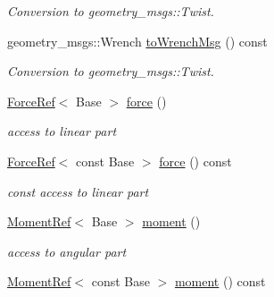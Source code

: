 \begin{DoxyCompactItemize}
\begin{DoxyCompactList}\small\item\em Conversion to geometry\+\_\+msgs\+::\+Twist. \end{DoxyCompactList}\item 
geometry\+\_\+msgs\+::\+Wrench \hyperlink{classow__core_1_1Wrench_a304d746f248d1503c41c3dde2d4bb674}{to\+Wrench\+Msg} () const \hypertarget{classow__core_1_1Wrench_a304d746f248d1503c41c3dde2d4bb674}{}\label{classow__core_1_1Wrench_a304d746f248d1503c41c3dde2d4bb674}

\begin{DoxyCompactList}\small\item\em Conversion to geometry\+\_\+msgs\+::\+Twist. \end{DoxyCompactList}\item 
\hyperlink{classow__core_1_1ForceRef}{Force\+Ref}$<$ Base $>$ \hyperlink{classow__core_1_1Wrench_a1280c591f4fc192916f6398d92074870}{force} ()\hypertarget{classow__core_1_1Wrench_a1280c591f4fc192916f6398d92074870}{}\label{classow__core_1_1Wrench_a1280c591f4fc192916f6398d92074870}

\begin{DoxyCompactList}\small\item\em access to linear part \end{DoxyCompactList}\item 
\hyperlink{classow__core_1_1ForceRef}{Force\+Ref}$<$ const Base $>$ \hyperlink{classow__core_1_1Wrench_a4e8dce56464223a729052e6ad83dbe52}{force} () const \hypertarget{classow__core_1_1Wrench_a4e8dce56464223a729052e6ad83dbe52}{}\label{classow__core_1_1Wrench_a4e8dce56464223a729052e6ad83dbe52}

\begin{DoxyCompactList}\small\item\em const access to linear part \end{DoxyCompactList}\item 
\hyperlink{classow__core_1_1MomentRef}{Moment\+Ref}$<$ Base $>$ \hyperlink{classow__core_1_1Wrench_a8ce23dd81a3aaffc0298531f785647de}{moment} ()\hypertarget{classow__core_1_1Wrench_a8ce23dd81a3aaffc0298531f785647de}{}\label{classow__core_1_1Wrench_a8ce23dd81a3aaffc0298531f785647de}

\begin{DoxyCompactList}\small\item\em access to angular part \end{DoxyCompactList}\item 
\hyperlink{classow__core_1_1MomentRef}{Moment\+Ref}$<$ const Base $>$ \hyperlink{classow__core_1_1Wrench_a2cddfa50e6078ff59f3bbcbb36bace2d}{moment} () const \hypertarget{classow__core_1_1Wrench_a2cddfa50e6078ff59f3bbcbb36bace2d}{}\label{classow__core_1_1Wrench_a2cddfa50e6078ff59f3bbcbb36bace2d}


\end{DoxyCompactItemize}
